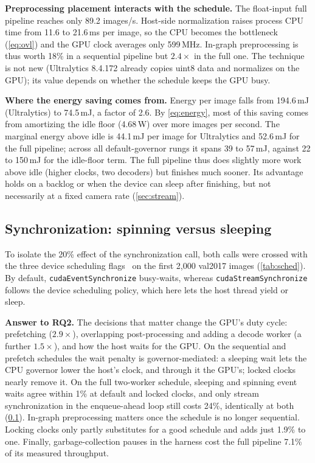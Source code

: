 \textbf{Preprocessing placement interacts with the schedule.}
The float-input full pipeline reaches only 89.2 images/s. Host-side normalization raises process CPU
time from 11.6 to 21.6\,ms per image, so the CPU becomes the bottleneck
(\cref{eq:ovl}) and the GPU clock averages only 599\,MHz. In-graph
preprocessing is thus worth 18\% in a sequential pipeline but
$2.4\times$ in the full one. The technique is not new (Ultralytics
8.4.172 already copies uint8 data and normalizes on the GPU); its value
depends on whether the schedule keeps the GPU busy.

\textbf{Where the energy saving comes from.}
Energy per image falls from 194.6\,mJ (Ultralytics) to 74.5\,mJ, a
factor of 2.6. By \cref{eq:energy}, most of this saving comes from
amortizing the idle floor (4.68\,W) over more images per second. The
marginal energy above idle is
44.1\,mJ per image for Ultralytics and 52.6\,mJ for the full pipeline;
across all default-governor rungs it spans 39 to 57\,mJ, against 22 to
150\,mJ for the idle-floor term. The full pipeline thus
does slightly more work above idle (higher clocks, two decoders) but
finishes much sooner. Its advantage holds on a backlog or when the
device can sleep after finishing, but not necessarily at a fixed camera
rate (\cref{sec:stream}).



\subsection{Synchronization: spinning versus sleeping}
\label{sec:sched}

To isolate the 20\% effect of the synchronization call, both calls
were crossed with the three device scheduling
flags~\cite{nvidia2024cuda} on the first 2,000 val2017 images
(\cref{tab:sched}). By default, \texttt{cudaEventSynchronize}
busy-waits, whereas \texttt{cudaStreamSynchronize} follows the device
scheduling policy, which here lets the host thread yield or sleep.





\textbf{Answer to RQ2.}
The decisions that matter change the GPU's duty cycle:
prefetching ($2.9\times$), overlapping post-processing and adding a
decode worker (a further $1.5\times$), and how the host waits for the
GPU. On the sequential and prefetch schedules the wait penalty is
governor-mediated: a sleeping wait lets the CPU governor lower the
host's clock, and through it the GPU's; locked clocks nearly remove it. On the full two-worker schedule, sleeping and
spinning event waits agree within 1\% at default and locked clocks, and
only stream synchronization in the enqueue-ahead loop still costs 24\%,
identically at both (\cref{sec:sched}). In-graph
preprocessing matters once the schedule is no longer sequential.
Locking clocks only partly substitutes for a good schedule and adds
just 1.9\% to one. Finally,
garbage-collection pauses in the harness cost the full pipeline 7.1\%
of its measured throughput.
